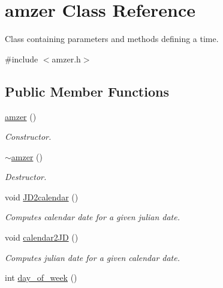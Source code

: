 \hypertarget{classamzer}{\section{amzer Class Reference}
\label{classamzer}
}


Class containing parameters and methods defining a time.  




{\ttfamily \#include $<$amzer.\-h$>$}

\subsection*{Public Member Functions}
\begin{DoxyCompactItemize}
\item 
\hypertarget{classamzer_ad5dd172e07b806de2ab9a59c17bff1c0}{\hyperlink{classamzer_ad5dd172e07b806de2ab9a59c17bff1c0}{amzer} ()}\label{classamzer_ad5dd172e07b806de2ab9a59c17bff1c0}

\begin{DoxyCompactList}\small\item\em Constructor. \end{DoxyCompactList}\item 
\hypertarget{classamzer_a5adfef80c7854a3c290385ae4a6d903b}{\hyperlink{classamzer_a5adfef80c7854a3c290385ae4a6d903b}{$\sim$amzer} ()}\label{classamzer_a5adfef80c7854a3c290385ae4a6d903b}

\begin{DoxyCompactList}\small\item\em Destructor. \end{DoxyCompactList}\item 
\hypertarget{classamzer_a447c26e968e1cfe9361e99dccabe9a51}{void \hyperlink{classamzer_a447c26e968e1cfe9361e99dccabe9a51}{J\-D2calendar} ()}\label{classamzer_a447c26e968e1cfe9361e99dccabe9a51}

\begin{DoxyCompactList}\small\item\em Computes calendar date for a given julian date. \end{DoxyCompactList}\item 
\hypertarget{classamzer_a7aefd80726aa80d5d0ebb60768754451}{void \hyperlink{classamzer_a7aefd80726aa80d5d0ebb60768754451}{calendar2\-J\-D} ()}\label{classamzer_a7aefd80726aa80d5d0ebb60768754451}

\begin{DoxyCompactList}\small\item\em Computes julian date for a given calendar date. \end{DoxyCompactList}\item 
\hypertarget{classamzer_a99086d2ea8467c2f66e4de033861fb67}{int \hyperlink{classamzer_a99086d2ea8467c2f66e4de033861fb67}{day\-\_\-of\-\_\-week} ()}\label{classamzer_a99086d2ea8467c2f66e4de033861fb67}


\end{DoxyCompactItemize}
